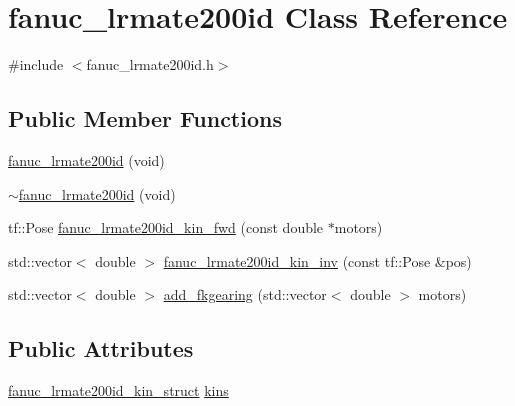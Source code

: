 \hypertarget{classfanuc__lrmate200id}{\section{fanuc\-\_\-lrmate200id Class Reference}
\label{classfanuc__lrmate200id}
}


{\ttfamily \#include $<$fanuc\-\_\-lrmate200id.\-h$>$}

\subsection*{Public Member Functions}
\begin{DoxyCompactItemize}
\item 
\hyperlink{classfanuc__lrmate200id_a7e429a44cb3d13fe8215f359960f7a9b}{fanuc\-\_\-lrmate200id} (void)
\item 
\hyperlink{classfanuc__lrmate200id_a6551f11049ee58956b95cdff731029c6}{$\sim$fanuc\-\_\-lrmate200id} (void)
\item 
tf\-::\-Pose \hyperlink{classfanuc__lrmate200id_ac294e0bd68a71663b12248f1053acf8e}{fanuc\-\_\-lrmate200id\-\_\-kin\-\_\-fwd} (const double $\ast$motors)
\item 
std\-::vector$<$ double $>$ \hyperlink{classfanuc__lrmate200id_a2c204696282e95430a410f5f3836fff6}{fanuc\-\_\-lrmate200id\-\_\-kin\-\_\-inv} (const tf\-::\-Pose \&pos)
\item 
std\-::vector$<$ double $>$ \hyperlink{classfanuc__lrmate200id_aaa3e4542f72ed143d04373610a644ab8}{add\-\_\-fkgearing} (std\-::vector$<$ double $>$ motors)
\end{DoxyCompactItemize}
\subsection*{Public Attributes}
\begin{DoxyCompactItemize}
\item 
\hyperlink{structfanuc__lrmate200id__kin__struct}{fanuc\-\_\-lrmate200id\-\_\-kin\-\_\-struct} \hyperlink{classfanuc__lrmate200id_afd60b9cabb3a40051d9370f3e4d1bf9a}{kins}
\end{DoxyCompactItemize}


